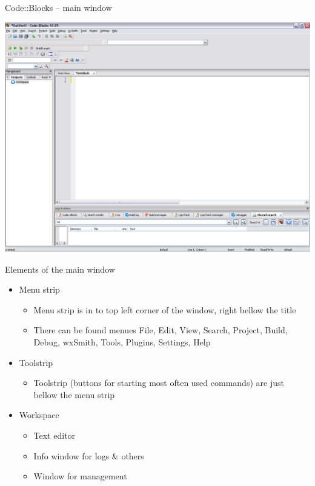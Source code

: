 \begin{frame}{Code::Blocks – main window}
\begin{center}
\includegraphics[scale=0.26]{images/cb_main}
\end{center}
\end{frame}

\begin{frame}{Elements of the main window}
\begin{itemize}
  \item Menu strip
    \begin{itemize}
      \item Menu strip is in to top left corner of the window, right
      bellow the title
      \item There can be found menues File, Edit,
      View, Search, Project, Build, Debug, wxSmith, Tools, Plugins, Settings, Help
    \end{itemize}
    \item Toolstrip
    \begin{itemize}
      \item Toolstrip (buttons for starting most often used commands) are just
      bellow the menu strip
    \end{itemize}
    \item Workspace
    \begin{itemize}
      \item Text editor
      \item Info window for logs \& others
      \item Window for management
    \end{itemize}   
\end{itemize}
\end{frame}

